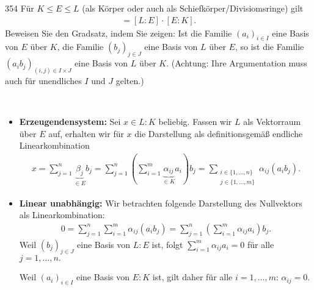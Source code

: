 \begin{algebraUE}{354}
Für $K \leq E \leq L$ (als Körper oder auch als Schiefkörper/Divisiomsringe) gilt
\begin{align*}
  [L:K] = [L:E]\cdot[E:K].
\end{align*}
Beweisen Sie den Gradsatz, indem Sie zeigen: Ist die Familie $(a_i)_{i \in I}$
eine Basis von $E$ über $K$, die Familie $(b_j)_{j \in J}$ eine Basis von $L$ über $E$,
so ist die Familie $(a_ib_j)_{(i,j) \in I \times J}$ eine Basis von $L$ über $K$.
(Achtung: Ihre Argumentation muss auch für unendliches $I$ und $J$ gelten.)

\end{algebraUE}

\begin{solution}
\leavevmode \\
  \begin{itemize}
      \item \textbf{Erzeugendensystem:} Sei $x \in L:K$ beliebig. Fassen wir $L$ als Vektorraum über $E$ auf, erhalten wir für $x$
      die Darstellung als definitionsgemäß endliche Linearkombination
  \begin{align*}
      x = \sum_{j=1}^n \underbrace{\beta_j}_{\in E} b_j = \sum_{j=1}^n \left(\sum_{i=1}^m \underbrace{\alpha_{ij}}_{\in K} a_i \right) b_j = \sum_{\substack{i \in \{1, ..., n\} \\ {j\in \{1,...,m\}}}} \alpha_{ij} (a_i b_j).
  \end{align*}
  \item \textbf{Linear unabhängig:} Wir betrachten folgende Darstellung des Nullvektors als Linearkombination:
  \begin{align*}
      0 = \sum_{j=1}^n \sum_{i=1}^m \alpha_{ij} (a_i b_j) = \sum_{j=1}^n \left(\sum_{i=1}^m \alpha_{ij} a_i\right) b_j.
  \end{align*}
  Weil $(b_j)_{j \in J}$ eine Basis von $L:E$ ist, folgt $\sum_{i=1}^m \alpha_{ij} a_i = 0$ für alle $j = 1,\dots,n.$

  Weil $(a_i)_{i \in I}$ eine Basis von $E:K$ ist, gilt daher für alle $i = 1,\dots,m$: $\alpha_{ij} = 0$.
  \end{itemize}
\end{solution}
